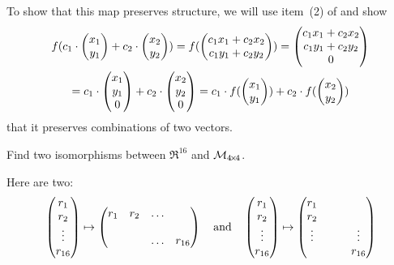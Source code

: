 \begin{exercises}
\begin{answer}
       To show that this map preserves structure, we will use
       item~(2) of  and show 
       \begin{multline*}
         f(c_1\cdot \begin{pmatrix} x_1 \\ y_1 \end{pmatrix}+c_2\cdot \begin{pmatrix} x_2 \\ y_2 \end{pmatrix})
          = f(\begin{pmatrix} c_1x_1+c_2x_2 \\ c_1y_1+c_2y_2 \end{pmatrix})  
          =\begin{pmatrix} c_1x_1+c_2x_2 \\ c_1y_1+c_2y_2 \\ 0 \end{pmatrix}                     \\
          =c_1\cdot \begin{pmatrix} x_1 \\ y_1 \\ 0 \end{pmatrix}+c_2\cdot \begin{pmatrix} x_2 \\ y_2 \\ 0 \end{pmatrix}
          =c_1\cdot f(\begin{pmatrix} x_1 \\ y_1 \end{pmatrix})+c_2\cdot f(\begin{pmatrix} x_2 \\ y_2 \end{pmatrix})
       \end{multline*}
       that it preserves combinations of two vectors.
     \end{answer}
  \item 
    Find two isomorphisms between \( \Re^{16} \) and
    \( \mathcal{M}_{4 \! \times \! 4} \).
     \begin{answer}
        Here are two:
        \begin{equation*}
           \begin{pmatrix} r_1 \\ r_2 \\ \vdots \\ r_{16} \end{pmatrix}
              \mapsto
           \begin{pmatrix}
              r_1  &r_2  &\ldots  \\
                   &              \\
                   &     &\ldots  &r_{16}
           \end{pmatrix}
           \quad\text{and}\quad
           \begin{pmatrix} r_1 \\ r_2 \\ \vdots \\ r_{16} \end{pmatrix}
              \mapsto
           \begin{pmatrix}
              r_1    &                    \\
              r_2    &                    \\
              \vdots &   &        &\vdots \\
                   &     &        &r_{16}

\end{pmatrix}
\end{equation*}
\end{answer}
\end{exercises}
